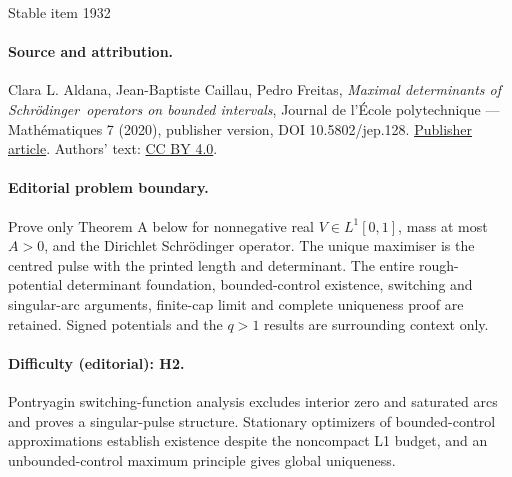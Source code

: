 \documentclass[11pt]{article}
\begin{document}
\begin{center}{\Large Stable item 1932}\end{center}
\paragraph{Source and attribution.}
Clara L. Aldana, Jean-Baptiste Caillau, Pedro Freitas, \emph{Maximal determinants of Schrödinger operators on bounded intervals}, Journal de l’École polytechnique — Mathématiques 7 (2020), publisher version, DOI 10.5802/jep.128. \href{https://jep.centre-mersenne.org/articles/10.5802/jep.128/}{Publisher article}. Authors' text: \href{https://creativecommons.org/licenses/by/4.0/}{CC BY 4.0}.
\paragraph{Editorial problem boundary.}
Prove only Theorem A below for nonnegative real \(V\in L^1[0,1]\), mass at most \(A>0\), and the Dirichlet Schrödinger operator. The unique maximiser is the centred pulse with the printed length and determinant. The entire rough-potential determinant foundation, bounded-control existence, switching and singular-arc arguments, finite-cap limit and complete uniqueness proof are retained. Signed potentials and the \(q>1\) results are surrounding context only.
\paragraph{Difficulty (editorial): H2.}
Pontryagin switching-function analysis excludes interior zero and saturated arcs and proves a singular-pulse structure. Stationary optimizers of bounded-control approximations establish existence despite the noncompact L1 budget, and an unbounded-control maximum principle gives global uniqueness.
\end{document}
